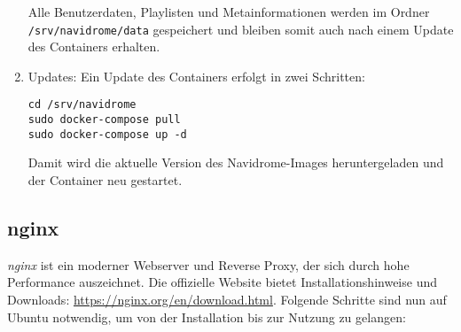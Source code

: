 \documentclass[12pt,a4paper]{report}
\begin{document}
\begin{enumerate}
    Alle Benutzerdaten, Playlisten und Metainformationen werden im Ordner \texttt{/srv/navidrome/data} gespeichert 
    und bleiben somit auch nach einem Update des Containers  erhalten.

    \item Updates:
    Ein Update des Containers erfolgt in zwei Schritten:

    \begin{verbatim}
cd /srv/navidrome
sudo docker-compose pull
sudo docker-compose up -d
    \end{verbatim}

    Damit wird die aktuelle Version des Navidrome-Images heruntergeladen und der Container neu gestartet.
  \end{enumerate}


  \subsection{nginx}  
  \emph{nginx} ist ein moderner Webserver und Reverse Proxy, der sich durch hohe Performance auszeichnet.  
  Die offizielle Website bietet Installationshinweise und Downloads: \url{https://nginx.org/en/download.html}.  
  Folgende Schritte sind nun auf Ubuntu notwendig, um von der Installation bis zur Nutzung zu gelangen:
\end{document}
